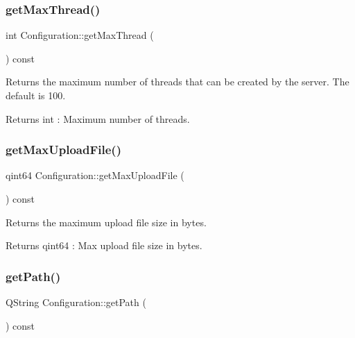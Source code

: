 \subsubsection{\texorpdfstring{get\+Max\+Thread()}{getMaxThread()}}
{\footnotesize\ttfamily int Configuration\+::get\+Max\+Thread (\begin{DoxyParamCaption}{ }\end{DoxyParamCaption}) const}



Returns the maximum number of threads that can be created by the server. The default is 100. 

\begin{DoxyReturn}{Returns}
int \+: Maximum number of threads. 
\end{DoxyReturn}
\mbox{\label{class_configuration_a8bc88e3cfe151837ee77e213e441953e}} 
\subsubsection{\texorpdfstring{get\+Max\+Upload\+File()}{getMaxUploadFile()}}
{\footnotesize\ttfamily qint64 Configuration\+::get\+Max\+Upload\+File (\begin{DoxyParamCaption}{ }\end{DoxyParamCaption}) const}



Returns the maximum upload file size in bytes. 

\begin{DoxyReturn}{Returns}
qint64 \+: Max upload file size in bytes. 
\end{DoxyReturn}
\mbox{\label{class_configuration_a43acf80f787217903281b0a6d3e01e11}} 
\subsubsection{\texorpdfstring{get\+Path()}{getPath()}}
{\footnotesize\ttfamily Q\+String Configuration\+::get\+Path (\begin{DoxyParamCaption}{ }\end{DoxyParamCaption}) const}



